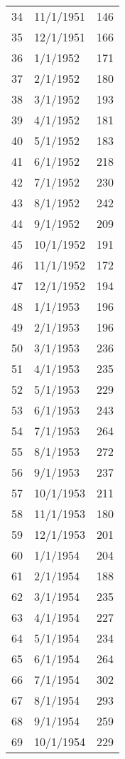 \begin{tabular}{llr}
34  &  11/1/1951 &         146 \\
35  &  12/1/1951 &         166 \\
36  &   1/1/1952 &         171 \\
37  &   2/1/1952 &         180 \\
38  &   3/1/1952 &         193 \\
39  &   4/1/1952 &         181 \\
40  &   5/1/1952 &         183 \\
41  &   6/1/1952 &         218 \\
42  &   7/1/1952 &         230 \\
43  &   8/1/1952 &         242 \\
44  &   9/1/1952 &         209 \\
45  &  10/1/1952 &         191 \\
46  &  11/1/1952 &         172 \\
47  &  12/1/1952 &         194 \\
48  &   1/1/1953 &         196 \\
49  &   2/1/1953 &         196 \\
50  &   3/1/1953 &         236 \\
51  &   4/1/1953 &         235 \\
52  &   5/1/1953 &         229 \\
53  &   6/1/1953 &         243 \\
54  &   7/1/1953 &         264 \\
55  &   8/1/1953 &         272 \\
56  &   9/1/1953 &         237 \\
57  &  10/1/1953 &         211 \\
58  &  11/1/1953 &         180 \\
59  &  12/1/1953 &         201 \\
60  &   1/1/1954 &         204 \\
61  &   2/1/1954 &         188 \\
62  &   3/1/1954 &         235 \\
63  &   4/1/1954 &         227 \\
64  &   5/1/1954 &         234 \\
65  &   6/1/1954 &         264 \\
66  &   7/1/1954 &         302 \\
67  &   8/1/1954 &         293 \\
68  &   9/1/1954 &         259 \\
69  &  10/1/1954 &         229 \\

\end{tabular}

